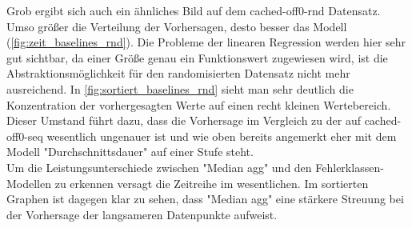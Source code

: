 \documentclass[
	12pt,
	a4paper,
	BCOR10mm,
	DIV14,
	listof=totoc,
	bibliography=totoc,
	headsepline
]{scrreprt}
\begin{document}
Grob ergibt sich auch ein ähnliches Bild auf dem cached-off0-rnd Datensatz. Umso größer die Verteilung der Vorhersagen, desto besser das Modell  (\ref{fig:zeit_baselines_rnd}). Die Probleme der linearen Regression werden hier sehr gut sichtbar, da einer Größe genau ein Funktionswert zugewiesen wird, ist die Abstraktionsmöglichkeit für den randomisierten Datensatz nicht mehr ausreichend. In \ref{fig:sortiert_baselines_rnd} sieht man sehr deutlich die Konzentration der vorhergesagten Werte auf einen recht kleinen Wertebereich. Dieser Umstand führt dazu, dass die Vorhersage im Vergleich zu der auf cached-off0-seq wesentlich ungenauer ist und wie oben bereits angemerkt eher mit dem Modell "Durchschnittsdauer" auf einer Stufe steht. \\
Um die Leistungsunterschiede zwischen "Median agg" und den Fehlerklassen-Modellen zu erkennen versagt die Zeitreihe im wesentlichen. Im sortierten Graphen ist dagegen klar zu sehen, dass "Median agg" eine stärkere Streuung bei der Vorhersage der langsameren Datenpunkte aufweist. 
\end{document}
